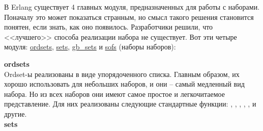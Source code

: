 В Erlang существует 4 главных модуля, предназначенных для работы с наборами.
Поначалу это может показаться странным, но смысл такого решения становится понятен, если знать, как оно появилось.
Разработчики решили, что <<лучшего>> способа реализации набора не существует.
Вот эти четыре модуля: \href{http://erldocs.com/R15B/stdlib/ordets.html}{ordsets}, \href{http://erldocs.com/R15B/stdlib/sets.html}{sets}, \href{http://erldocs.com/R15B/stdlib/gb\_sets.html}{gb\_sets} и \href{http://erldocs.com/R15B/stdlib/sofs.html}{sofs} (наборы наборов):

\begin{minipage}{1.0\linewidth}
    \textbf{ordsets}\\
    Ordset\--ы реализованы в виде упорядоченного списка.
    Главным образом, их хорошо использовать для небольших наборов, и они \--- самый медленный вид набора.
    Но из всех наборов они имеют самое простое и легкочитаемое представление.
    Для них реализованы следующие стандартные функции: , , , , ,  и другие.\\
    \blankline
    \textbf{sets}\\

\end{minipage}
